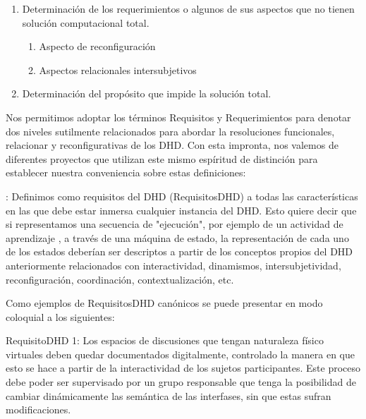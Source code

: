 \begin{enumerate} \label{requerimientositems}
 \item  Determinación de los requerimientos o algunos de sus aspectos que
no tienen solución computacional total.
 
 \begin{enumerate}
 \item Aspecto de reconfiguración 
 \item Aspectos relacionales intersubjetivos 
 \end{enumerate}
\item Determinación del propósito que impide la solución total.

\end{enumerate}


Nos permitimos adoptar los términos Requisitos y Requerimientos para denotar dos
niveles sutilmente relacionados para abordar la resoluciones funcionales,
relacionar y reconfigurativas de los DHD. Con esta impronta, nos valemos de
diferentes
proyectos \cite{requerimiento1,requerimiento2,requerimiento3,requerimiento4} que
utilizan este mismo espíritud de distinción para establecer nuestra conveniencia
sobre estas definiciones: 

\begin{defi} [Requisito]: Definimos como requisitos del DHD (RequisitosDHD) a
todas las características en las que debe estar inmersa cualquier instancia del
DHD. Esto quiere decir que si representamos una secuencia de "ejecución", por
ejemplo de un actividad de aprendizaje \cite{cacic2007}, a través de una
máquina de estado, la representación de cada uno de los estados deberían ser
descriptos a partir de los conceptos propios del DHD anteriormente
relacionados con interactividad, dinamismos, intersubjetividad, reconfiguración,
coordinación, contextualización, etc.
\end{defi} \label{requisito}

Como ejemplos de RequisitosDHD canónicos se puede presentar en modo
coloquial a los siguientes:

\begin{ejemplo}
RequisitoDHD 1: Los espacios de discusiones que tengan naturaleza físico
virtuales deben quedar documentados digitalmente, controlado la manera en que
esto se hace a partir de la interactividad de los sujetos participantes. Este
proceso debe poder ser supervisado por un grupo responsable que tenga la
posibilidad de cambiar dinámicamente las semántica de las interfases, sin que
estas sufran modificaciones.
\end{ejemplo}

